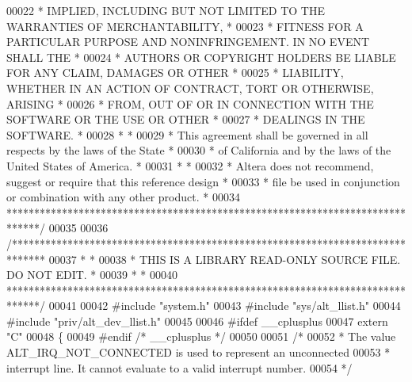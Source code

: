 \begin{DoxyCode}
00022 \textcolor{comment}{* IMPLIED, INCLUDING BUT NOT LIMITED TO THE WARRANTIES OF MERCHANTABILITY,    *}
00023 \textcolor{comment}{* FITNESS FOR A PARTICULAR PURPOSE AND NONINFRINGEMENT. IN NO EVENT SHALL THE *}
00024 \textcolor{comment}{* AUTHORS OR COPYRIGHT HOLDERS BE LIABLE FOR ANY CLAIM, DAMAGES OR OTHER      *}
00025 \textcolor{comment}{* LIABILITY, WHETHER IN AN ACTION OF CONTRACT, TORT OR OTHERWISE, ARISING     *}
00026 \textcolor{comment}{* FROM, OUT OF OR IN CONNECTION WITH THE SOFTWARE OR THE USE OR OTHER         *}
00027 \textcolor{comment}{* DEALINGS IN THE SOFTWARE.                                                   *}
00028 \textcolor{comment}{*                                                                             *}
00029 \textcolor{comment}{* This agreement shall be governed in all respects by the laws of the State   *}
00030 \textcolor{comment}{* of California and by the laws of the United States of America.              *}
00031 \textcolor{comment}{*                                                                             *}
00032 \textcolor{comment}{* Altera does not recommend, suggest or require that this reference design    *}
00033 \textcolor{comment}{* file be used in conjunction or combination with any other product.          *}
00034 \textcolor{comment}{******************************************************************************/}
00035 
00036 \textcolor{comment}{/******************************************************************************}
00037 \textcolor{comment}{*                                                                             *}
00038 \textcolor{comment}{* THIS IS A LIBRARY READ-ONLY SOURCE FILE. DO NOT EDIT.                       *}
00039 \textcolor{comment}{*                                                                             *}
00040 \textcolor{comment}{******************************************************************************/}
00041 
00042 \textcolor{preprocessor}{#include "system.h"}
00043 \textcolor{preprocessor}{#include "sys/alt_llist.h"}
00044 \textcolor{preprocessor}{#include "priv/alt_dev_llist.h"}
00045 
00046 \textcolor{preprocessor}{#ifdef \_\_cplusplus}
00047 \textcolor{keyword}{extern} \textcolor{stringliteral}{"C"}
00048 \{
00049 \textcolor{preprocessor}{#endif }\textcolor{comment}{/* \_\_cplusplus */}\textcolor{preprocessor}{}
00050 
00051 \textcolor{comment}{/*}
00052 \textcolor{comment}{ * The value ALT\_IRQ\_NOT\_CONNECTED is used to represent an unconnected }
00053 \textcolor{comment}{ * interrupt line. It cannot evaluate to a valid interrupt number.}
00054 \textcolor{comment}{ */}

\end{DoxyCode}
